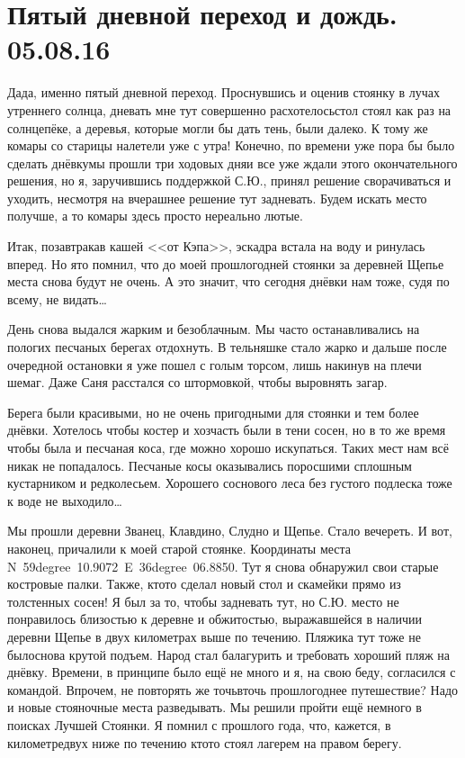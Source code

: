 \chapter{Пятый дневной переход и дождь. 05.08.16} 

Да\sdash да, именно пятый дневной переход. Проснувшись и оценив стоянку в лучах утреннего солнца, дневать мне тут совершенно расхотелось\mdash стол стоял как раз на солнцепёке, а деревья, которые могли бы дать тень, были далеко. К тому же комары со старицы налетели уже с утра! Конечно, по времени уже пора бы было сделать днёвку\mdash мы прошли три ходовых дня\mdash и все уже ждали этого окончательного решения, но я, заручившись поддержкой С.Ю., принял решение сворачиваться и уходить, несмотря на вчерашнее решение тут задневать. Будем искать место получше, а то комары здесь просто нереально лютые.

Итак, позавтракав кашей <<от Кэпа>>, эскадра встала на воду и ринулась вперед. Но я\sdash то помнил, что до моей прошлогодней стоянки за деревней Щепье места снова будут не очень. А это значит, что сегодня днёвки нам тоже, судя по всему, не видать\ldots 

День снова выдался жарким и безоблачным. Мы часто останавливались на пологих песчаных берегах отдохнуть. В тельняшке стало жарко и дальше после очередной остановки я уже пошел с голым торсом, лишь накинув на плечи шемаг. Даже Саня расстался со штормовкой, чтобы выровнять загар. 

Берега были красивыми, но не очень пригодными для стоянки и тем более днёвки. Хотелось чтобы костер и хозчасть были в тени сосен, но в то же время чтобы была и песчаная коса, где можно хорошо искупаться. Таких мест нам всё никак не попадалось. Песчаные косы оказывались поросшими сплошным кустарником и редколесьем. Хорошего соснового леса без густого подлеска тоже к воде не выходило\ldots 

Мы прошли деревни Званец, Клавдино, Слудно и Щепье. Стало вечереть. И вот, наконец, причалили к моей старой стоянке. Координаты места N~59degree~10.9072\textprime~E~36degree~06.8850\textprime. Тут я снова обнаружил свои старые костровые палки. Также, кто\sdash то сделал новый стол и скамейки прямо из толстенных сосен! Я был за то, чтобы задневать тут, но С.Ю. место не понравилось близостью к деревне и обжитостью, выражавшейся в наличии деревни Щепье в двух километрах выше по течению. Пляжика тут тоже не было\mdash снова крутой подъем. Народ стал балагурить и требовать хороший пляж на днёвку. Времени, в принципе было ещё не много и я, на свою беду, согласился с командой. Впрочем, не повторять же точь\sdash в\sdash точь прошлогоднее путешествие? Надо и новые стояночные места разведывать. Мы решили пройти ещё немного в поисках Лучшей Стоянки. Я помнил с прошлого года, что, кажется, в километре\sdash двух ниже по течению кто\sdash то стоял лагерем на правом берегу.

